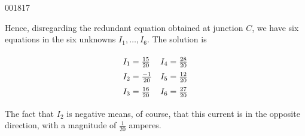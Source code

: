 \begin{example}{}{001817}
\begin{solution}
Hence, disregarding the redundant equation obtained at junction $C$, we have six equations in the six unknowns $I_1, \dots, I_6$. The solution is

\begin{equation*}
\def\arraystretch{1.5}
\begin{array}{ll}
	I_1 = \frac{15}{20} & I_4 = \frac{28}{20} \\
	I_2 = \frac{-1}{20} & I_5 = \frac{12}{20} \\
	I_3 = \frac{16}{20} & I_6 = \frac{27}{20}
\end{array}
\end{equation*}

The fact that $I_2$ is negative means, of course, that this current is in the opposite direction, with a magnitude of $\frac{1}{20}$ amperes.

\end{solution}

\end{example}

